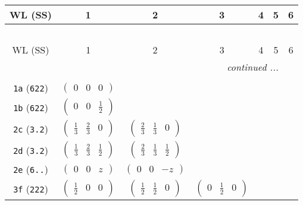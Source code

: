 \documentclass[fleqn,9pt,landscape]{jsarticle}
\begin{document}
\begin{center}
\renewcommand{\arraystretch}{1.2}
\begin{longtable}{ccccccc}
 \hline \hline
WL (SS) & 1 & 2 & 3 & 4 & 5 & 6 \\ \hline \endfirsthead

\multicolumn{6}{l}{\tablename\ \thetable{}} \\
 \hline \hline
WL (SS) & 1 & 2 & 3 & 4 & 5 & 6 \\ \hline \endhead

 \hline \hline
\multicolumn{6}{r}{\footnotesize\it continued ...} \\ \endfoot

 \hline \hline
\multicolumn{6}{r}{} \\ \endlastfoot

{\tt 1a} ({\tt 622}) & $ \begin{pmatrix} 0 & 0 & 0 \end{pmatrix} $ & $  $ & $  $ & $  $ & $  $ & $  $ \\ \hline
{\tt 1b} ({\tt 622}) & $ \begin{pmatrix} 0 & 0 & \frac{1}{2} \end{pmatrix} $ & $  $ & $  $ & $  $ & $  $ & $  $ \\ \hline
{\tt 2c} ({\tt 3.2}) & $ \begin{pmatrix} \frac{1}{3} & \frac{2}{3} & 0 \end{pmatrix} $ & $ \begin{pmatrix} \frac{2}{3} & \frac{1}{3} & 0 \end{pmatrix} $ & $  $ & $  $ & $  $ & $  $ \\ \hline
{\tt 2d} ({\tt 3.2}) & $ \begin{pmatrix} \frac{1}{3} & \frac{2}{3} & \frac{1}{2} \end{pmatrix} $ & $ \begin{pmatrix} \frac{2}{3} & \frac{1}{3} & \frac{1}{2} \end{pmatrix} $ & $  $ & $  $ & $  $ & $  $ \\ \hline
{\tt 2e} ({\tt 6..}) & $ \begin{pmatrix} 0 & 0 & z \end{pmatrix} $ & $ \begin{pmatrix} 0 & 0 & - z \end{pmatrix} $ & $  $ & $  $ & $  $ & $  $ \\ \hline
{\tt 3f} ({\tt 222}) & $ \begin{pmatrix} \frac{1}{2} & 0 & 0 \end{pmatrix} $ & $ \begin{pmatrix} \frac{1}{2} & \frac{1}{2} & 0 \end{pmatrix} $ & $ \begin{pmatrix} 0 & \frac{1}{2} & 0 \end{pmatrix} $ & $  $ & $  $ & $  $ \\ \hline

\end{longtable}
\end{center}
\end{document}
